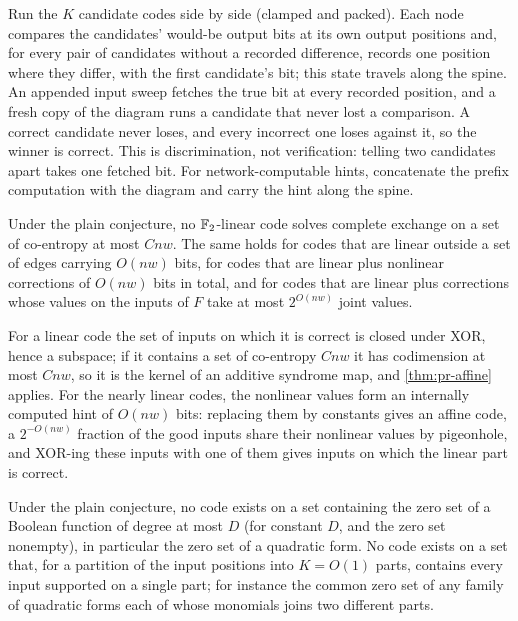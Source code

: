 \begin{outline}
Run the $K$ candidate codes side by side (clamped and packed). Each node compares the candidates'
would-be output bits at its own output positions and, for every pair of candidates without a recorded
difference, records one position where they differ, with the first candidate's bit; this state
travels along the spine. An appended input sweep fetches the true bit at every recorded position, and
a fresh copy of the diagram runs a candidate that never lost a comparison. A correct candidate never
loses, and every incorrect one loses against it, so the winner is correct. This is discrimination,
not verification: telling two candidates apart takes one fetched bit. For network-computable hints,
concatenate the prefix computation with the diagram and carry the hint along the spine.
\end{outline}

\begin{theorem}\label{thm:pr-linear}
Under the plain conjecture, no $\mathbb{F}_2$-linear code solves complete exchange on a set of co-entropy at
most $Cnw$. The same holds for codes that are linear outside a set of edges carrying $O(nw)$ bits, for
codes that are linear plus nonlinear corrections of $O(nw)$ bits in total, and for codes that are
linear plus corrections whose values on the inputs of $F$ take at most $2^{O(nw)}$ joint values.
\end{theorem}

\begin{outline}
For a linear code the set of inputs on which it is correct is closed under XOR, hence a subspace; if it
contains a set of co-entropy $Cnw$ it has codimension at most $Cnw$, so it is the kernel of an additive
syndrome map, and \cref{thm:pr-affine} applies. For the nearly linear codes, the nonlinear values form
an internally computed hint of $O(nw)$ bits: replacing them by constants gives an affine code, a
$2^{-O(nw)}$ fraction of the good inputs share their nonlinear values by pigeonhole, and XOR-ing these
inputs with one of them gives inputs on which the linear part is correct.
\end{outline}

\begin{theorem}\label{thm:pr-degree}
Under the plain conjecture, no code exists on a set containing the zero set of a Boolean function of
degree at most $D$ (for constant $D$, and the zero set nonempty), in particular the zero set of a
quadratic form. No code exists on a set that, for a partition of the input positions into $K=O(1)$
parts, contains every input supported on a single part; for instance the common zero set of any
family of quadratic forms each of whose monomials joins two different parts.
\end{theorem}

